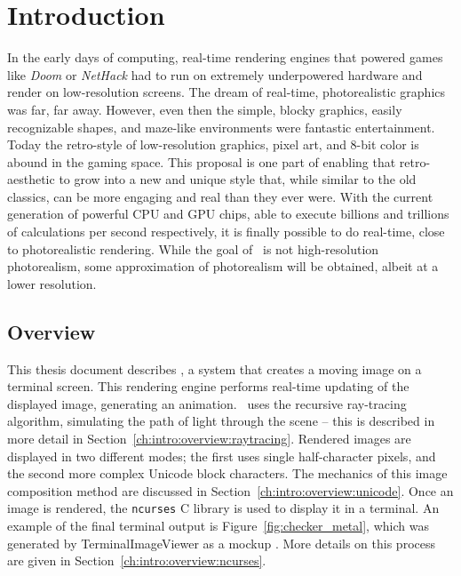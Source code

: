%
%

\chapter{Introduction}
\label{ch:intro}

In the early days of computing, real-time rendering engines that powered games like {\it Doom} or {\it NetHack} had to run on extremely underpowered hardware and render on low-resolution screens.
The dream of real-time, photorealistic graphics was far, far away.
However, even then the simple, blocky graphics, easily recognizable shapes, and maze-like environments were fantastic entertainment.
Today the retro-style of low-resolution graphics, pixel art, and 8-bit color is abound in the gaming space.
This proposal is one part of enabling that retro-aesthetic to grow into a new and unique style that, while similar to the old classics, can be more engaging and real than they ever were.
With the current generation of powerful CPU and GPU chips, able to execute billions and trillions of calculations per second respectively, it is finally possible to do real-time, close to photorealistic rendering.
While the goal of \name\ is not high-resolution photorealism, some approximation of photorealism will be obtained, albeit at a lower resolution.

\section{Overview}
\label{ch:intro:overview}

This thesis document describes \name, a system that creates a moving image on a terminal screen.
This rendering engine performs real-time updating of the displayed image, generating an animation.
\name\ uses the recursive ray-tracing algorithm, simulating the path of light through the scene -- this is described in more detail in Section~\ref{ch:intro:overview:raytracing}.
Rendered images are displayed in two different modes; the first uses single half-character pixels, and the second more complex Unicode block characters.
The mechanics of this image composition method are discussed in Section~\ref{ch:intro:overview:unicode}.
Once an image is rendered, the \texttt{ncurses} C library \cite{ncursesLibrary} is used to display it in a terminal.
An example of the final terminal output is Figure~\ref{fig:checker_metal}, which was generated by TerminalImageViewer \cite{tivGithub} as a mockup .
More details on this process are given in Section~\ref{ch:intro:overview:ncurses}.

